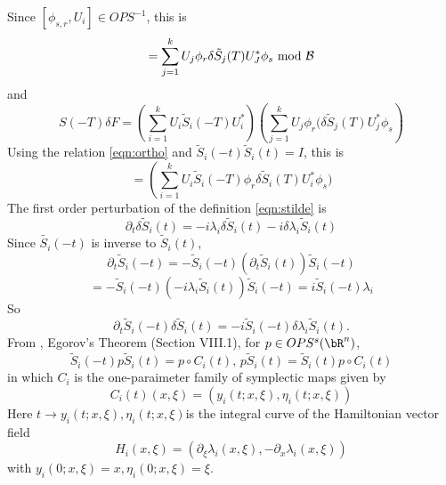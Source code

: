 Since $[\phi_{s,r},U_i] \in OPS^{-1}$, this is
\[
  = \sum_{j=1}^k U_j \phi_r \delta \tilde{S}_j(T) U_J^*\phi_s 
  \mbox{ mod }{\cal B}
\]
and
\[
 S(-T)\delta F =\left(\sum_{i=1}^k U_i \tilde{S}_i(-T)
    U_i^*\right) \left(\sum_{j=1}^k U_j \phi_r (\delta\tilde{S}_j(T) U_j^*\phi_s\right)
\]
Using the relation \ref{eqn:ortho} and $\tilde{S}_i(-t)\tilde{S}_i(t)=I$, this is
\[
  = \left(\sum_{i=1}^k U_i \tilde{S}_i(-T) \phi_r \delta\tilde{S}_i(T) U_i^*\phi_s
)
\]
The first order perturbation of the definition \ref{eqn:stilde} is
\begin{equation}
  \label{eqn:dstilde}
  \partial_t \delta \tilde{S}_i(t) = - i\lambda_i \delta
  \tilde{S}_i(t) - i\delta \lambda_i \tilde{S}_i(t)
\end{equation}
Since $\tilde{S_i}(-t)$ is inverse to $\tilde{S}_i(t)$,
\[
  \partial_t \tilde{S}_i(-t)= -\tilde{S}_i(-t) (\partial_t \tilde{S}_i(t)) \tilde{S}_i(-t)
\]
\begin{equation}
  \label{eqn:stildeinv}
= -\tilde{S}_i(-t)(-i\lambda_i \tilde{S}_i(t)) \tilde{S}_i(-t) = i\tilde{S}_i(-t)\lambda_i 
\end{equation}
So
\begin{equation}
  \label{eqn:dstildeconj}
  \partial_t\tilde{S}_i(-t)\delta \tilde{S}_i(t) = -i\tilde{S}_i(-t)\delta \lambda_i \tilde{S}_i(t).
\end{equation}
From \cite{Tay:81}, Egorov's Theorem (Section VIII.1), for $p \in OPS^s(\bR^n)$,
\begin{equation}
  \label{eqn:egorov}
   \tilde{S}_i(-t) p \tilde{S}_i(t)=  p \circ C_i(t),\, p\tilde{S}_i(t) =
   \tilde{S}_i(t)p \circ C_i(t)
\end{equation}
in which $C_i$ is the one-paraimeter family of symplectic maps given by
\begin{equation}
  \label{eqn:canon}
  C_i(t)(x,\xi)=(y_i(t;x,\xi),\eta_i(t;x,\xi))
\end{equation}
Here $t \rightarrow y_i(t;x,\xi),\eta_i(t;x,\xi) $is the integral curve of the
Hamiltonian vector field
\[
  H_i(x,\xi) = (\partial_{\xi}\lambda_i(x,\xi), - \partial_x\lambda_i(x,\xi))
\]
with $y_i(0;x,\xi)=x, \eta_i(0;x,\xi)=\xi$.

